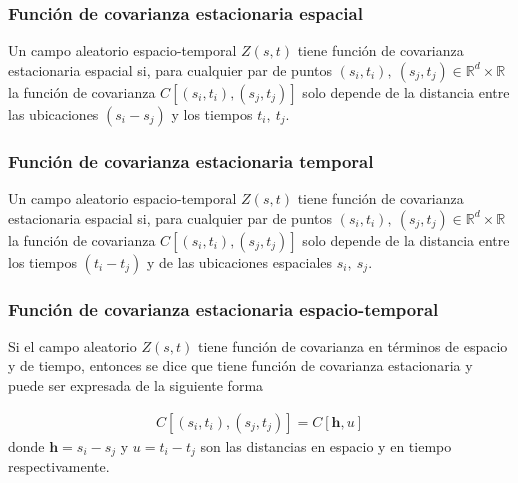 \documentclass[
]{book}
\begin{document}
\hypertarget{funciuxf3n-de-covarianza-estacionaria-espacial}{%
\subsubsection*{Función de covarianza estacionaria espacial}\label{funciuxf3n-de-covarianza-estacionaria-espacial}}

Un campo aleatorio espacio-temporal \(Z(s,t)\) tiene función de covarianza estacionaria espacial si, para cualquier par de puntos \((s_i,t_i),\ (s_j,t_j) \in \mathbb{R}^d \times \mathbb{R}\) la función de covarianza \(C[(s_i,t_i),(s_j,t_j)]\) solo depende de la distancia entre las ubicaciones \((s_i-s_j)\) y los tiempos \(t_i,\ t_j\).

\hypertarget{funciuxf3n-de-covarianza-estacionaria-temporal}{%
\subsubsection*{Función de covarianza estacionaria temporal}\label{funciuxf3n-de-covarianza-estacionaria-temporal}}

Un campo aleatorio espacio-temporal \(Z(s,t)\) tiene función de covarianza estacionaria espacial si, para cualquier par de puntos \((s_i,t_i),\ (s_j,t_j) \in \mathbb{R}^d \times \mathbb{R}\) la función de covarianza \(C[(s_i,t_i),(s_j,t_j)]\) solo depende de la distancia entre los tiempos \((t_i-t_j)\) y de las ubicaciones espaciales \(s_i,\ s_j\).

\hypertarget{funciuxf3n-de-covarianza-estacionaria-espacio-temporal}{%
\subsubsection*{Función de covarianza estacionaria espacio-temporal}\label{funciuxf3n-de-covarianza-estacionaria-espacio-temporal}}

Si el campo aleatorio \(Z(s,t)\) tiene función de covarianza en términos de espacio y de tiempo, entonces se dice que tiene función de covarianza estacionaria y puede ser expresada de la siguiente forma

\[
\begin{align*}
C[(s_i,t_i),(s_j,t_j)]=C[\boldsymbol h,u]
\end{align*}
\] donde \(\boldsymbol h=s_i-s_j\) y \(u=t_i-t_j\) son las distancias en espacio y en tiempo respectivamente.
\end{document}
